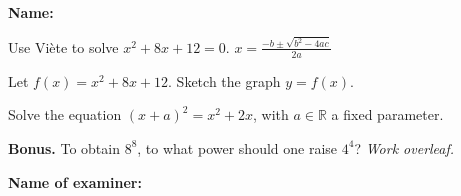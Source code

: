 \documentclass[8pt]{exam}
\begin{document}
\textbf{Name:} \dotfill

\begin{questions}
\question[2] Use Viète to solve $x^2 + 8x + 12 = 0$. \hfill $x = \frac{-b \pm \sqrt{b^2-4ac}}{2a}$
\fillwithdottedlines{5cm}

\question[4] Let $f( x ) = x^2 + 8x + 12$. Sketch the graph $y = f(x)$.

\vspace{-2mm}
\begin{minipage}[t]{0.5\textwidth}
\vspace{0mm}

\fillwithdottedlines{65mm}

\end{minipage}
\hfill
\begin{minipage}[t]{0.4\textwidth}
\vspace{0mm}

\end{minipage}

\question[2] Solve the equation $(x+a)^2 = x^2+2x$, with $a\in \mathbb{R}$ a fixed parameter.
\fillwithdottedlines{45mm}

\question \textbf{Bonus.} To obtain $8^8$, to what power should one raise $4^4$?  \emph{Work overleaf.}

\vfill


\end{questions}

\begin{tcolorbox}

\textbf{Name of examiner:}

\begin{center}
\gradetable[h][questions]
\end{center}

\end{tcolorbox}
\end{document}
